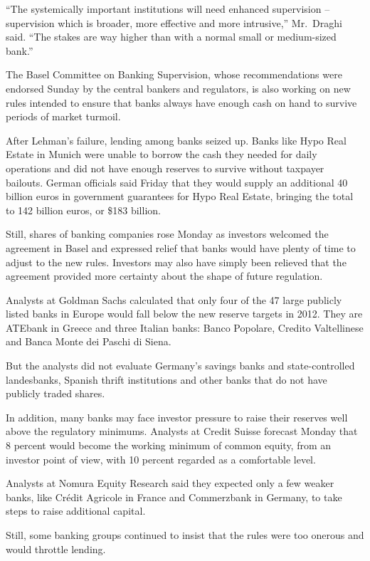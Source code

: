 ﻿\documentclass[12pt]{article}
\begin{document}
``The systemically important institutions will need enhanced supervision -- supervision which is
broader, more effective and more intrusive,'' Mr.~Draghi said. ``The stakes are way higher than with
a normal small or medium-sized bank.''

The Basel Committee on Banking Supervision, whose recommendations were endorsed Sunday by the
central bankers and regulators, is also working on new rules intended to ensure that banks always
have enough cash on hand to survive periods of market turmoil.

After Lehman's failure, lending among banks seized up. Banks like Hypo Real Estate in Munich were
unable to borrow the cash they needed for daily operations and did not have enough reserves to
survive without taxpayer bailouts. German officials said Friday that they would supply an additional
40 billion euros in government guarantees for Hypo Real Estate, bringing the total to 142 billion
euros, or \$183 billion.

Still, shares of banking companies rose Monday as investors welcomed the agreement in Basel and
expressed relief that banks would have plenty of time to adjust to the new rules. Investors may also
have simply been relieved that the agreement provided more certainty about the shape of future
regulation.

Analysts at Goldman Sachs calculated that only four of the 47 large publicly listed banks in Europe
would fall below the new reserve targets in 2012. They are ATEbank in Greece and three Italian
banks: Banco Popolare, Credito Valtellinese and Banca Monte dei Paschi di Siena.

But the analysts did not evaluate Germany's savings banks and state-controlled landesbanks, Spanish
thrift institutions and other banks that do not have publicly traded shares.

In addition, many banks may face investor pressure to raise their reserves well above the regulatory
minimums. Analysts at Credit Suisse forecast Monday that 8 percent would become the working minimum
of common equity, from an investor point of view, with 10 percent regarded as a comfortable level.

Analysts at Nomura Equity Research said they expected only a few weaker banks, like Cr\'edit
Agricole in France and Commerzbank in Germany, to take steps to raise additional capital.

Still, some banking groups continued to insist that the rules were too onerous and would throttle
lending.
\end{document}
